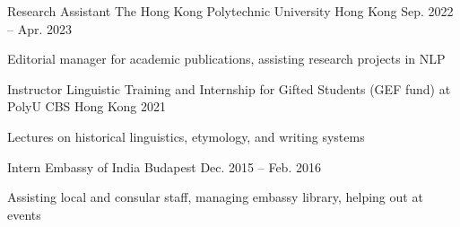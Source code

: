
\begin{cventries}

  \cventry
    {Research Assistant} %
    {The Hong Kong Polytechnic University} %
    {Hong Kong} %
    {Sep. 2022 -- Apr. 2023} %
    {
      \begin{cvitems} %
        \item {Editorial manager for academic publications, assisting research projects in NLP}
      \end{cvitems}
    }

  \cventry
    {Instructor} %
    {Linguistic Training and Internship for Gifted Students (GEF fund) at PolyU CBS} %
    {Hong Kong} %
    {2021} %
    {
      \begin{cvitems} %
        \item {Lectures on historical linguistics, etymology, and writing systems}
      \end{cvitems}
    }

  \cventry
    {Intern} %
    {Embassy of India} %
    {Budapest} %
    {Dec. 2015 -- Feb. 2016} %
    {
      \begin{cvitems} %
        \item {Assisting local and consular staff, managing embassy library, helping out at events}
      \end{cvitems}
    }

\end{cventries}
